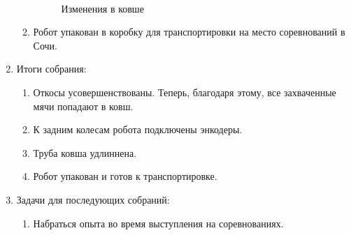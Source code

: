 \begin{enumerate}
\begin{enumerate}
      \begin{figure}[H]
      	\begin{minipage}[h]{0.2\linewidth}
      		\center  
      	\end{minipage}
      	\begin{minipage}[h]{0.6\linewidth}
      		\caption{Изменения в ковше}
      	\end{minipage}
      \end{figure}
      
      \item Робот упакован в коробку для транспортировки на место соревнований в Сочи.
          
    \end{enumerate}
    
	\item Итоги собрания: 
	\begin{enumerate}
	  \item Откосы усовершенствованы. Теперь, благодаря этому, все захваченные мячи попадают в ковш.
	  
      \item К задним колесам робота подключены энкодеры.
      
      \item Труба ковша удлиннена.
      
      \item Робот упакован и готов к транспортировке.
      
    \end{enumerate}
    
	\item Задачи для последующих собраний:
	\begin{enumerate}
	  \item Набраться опыта во время выступления на соревнованиях.
	  
    \end{enumerate}     
\end{enumerate}
\fillpage